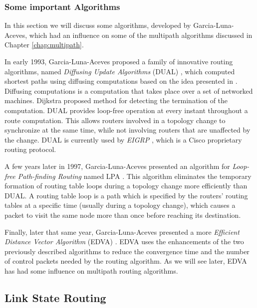\subsubsection{Some important Algorithms}
\label{sect:DUAL}
In this section we will discuss some algorithms, developed by Garcia-Luna-Aceves, which had an influence on some of the multipath algorithms discussed in Chapter \ref{chap:multipath}.

In early 1993, Garcia-Luna-Aceves proposed a family of innovative routing algorithms, named \textit{Diffusing Update Algorithms} (DUAL) \cite{DUAL}, which computed shortest paths using diffusing computations based on the idea presented in \cite{DijkstraTerm}. Diffusing computations is a computation that takes place over a set of networked machines. Dijkstra proposed method \cite{DijkstraTerm}  for detecting the termination of the computation. DUAL provides loop-free operation at every instant throughout a route computation. This allows routers involved in a topology change to synchronize at the same time, while not involving routers that are unaffected by the change. DUAL is currently used by \textit{EIGRP} \cite{EIGRP}, which is a Cisco proprietary routing protocol.

A few years later in 1997, Garcia-Luna-Aceves presented an algorithm for \textit{Loop-free Path-finding Routing} named LPA \cite{LPA}. This algorithm eliminates the temporary formation of routing table loops during a topology change more efficiently than DUAL. A routing table loop is a path which is specified by the routers' routing tables at a specific time (usually during a topology change), which causes a packet to visit the same node more than once before reaching its destination. 

Finally, later that same year, Garcia-Luna-Aceves presented a more \textit{Efficient Distance Vector Algorithm} (EDVA) \cite{EDVA}. EDVA uses the enhancements of the two previously described algorithms to reduce the convergence time and the number of control packets needed by the routing algorithm. As we will see later, EDVA has had some influence on multipath routing algorithms. 


\subsection{Link State Routing}

